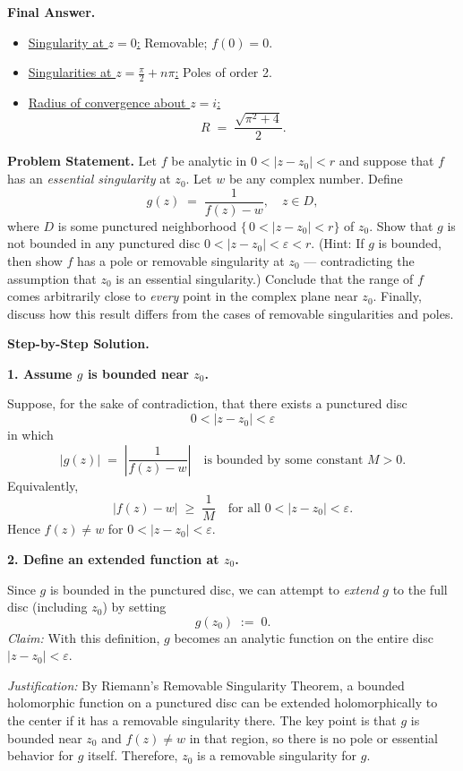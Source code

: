 \documentclass[12pt]{article}
\theoremstyle{definition} %
\theoremstyle{plain} %
\begin{document}
\medskip
\noindent
\textbf{Final Answer.}
\begin{itemize}
\item \underline{Singularity at $z=0$:} Removable; $f(0)=0$.
\item \underline{Singularities at $z = \frac{\pi}{2} + n\pi$:} Poles of order 2.
\item \underline{Radius of convergence about $z=i$:} 
\[
R \;=\; \frac{\sqrt{\pi^2 + 4}}{2}.
\]
\end{itemize}
\textbf{Problem Statement.} 
Let $f$ be analytic in $0 < |z - z_0| < r$ and suppose that $f$ has an \emph{essential singularity} at $z_0$. Let $w$ be any complex number. Define
\[
g(z) \;=\; \frac{1}{f(z) - w}, \quad z \in D,
\]
where $D$ is some punctured neighborhood $\{\,0 < |z - z_0| < r\}$ of $z_0$. Show that $g$ is not bounded in any punctured disc $0 < |z - z_0| < \varepsilon < r$. (Hint: If $g$ is bounded, then show $f$ has a pole or removable singularity at $z_0$ --- contradicting the assumption that $z_0$ is an essential singularity.) Conclude that the range of $f$ comes arbitrarily close to \emph{every} point in the complex plane near $z_0$. Finally, discuss how this result differs from the cases of removable singularities and poles.

\bigskip
\noindent
\textbf{Step-by-Step Solution.}

\medskip
\noindent
\textbf{1. Assume $g$ is bounded near $z_0$.}

Suppose, for the sake of contradiction, that there exists a punctured disc 
\[
0 < |z - z_0| < \varepsilon
\]
in which
\[
\bigl|g(z)\bigr| \;=\; \left|\frac{1}{f(z) - w}\right|\quad
\text{is bounded by some constant } M > 0.
\]
Equivalently,
\[
|f(z) - w| \;\ge\; \frac{1}{M} \quad \text{for all } 0 < |z - z_0| < \varepsilon.
\]
Hence $f(z) \neq w$ for $0 < |z - z_0| < \varepsilon$.

\medskip
\noindent
\textbf{2. Define an extended function at $z_0$.}

Since $g$ is bounded in the punctured disc, we can attempt to \emph{extend} $g$ to the full disc (including $z_0$) by setting
\[
g(z_0) \;:=\; 0.
\]
\emph{Claim:} With this definition, $g$ becomes an analytic function on the entire disc $|z - z_0| < \varepsilon$. 

\smallskip
\noindent
\emph{Justification:} By Riemann's Removable Singularity Theorem, a bounded holomorphic function on a punctured disc can be extended holomorphically to the center if it has a removable singularity there. The key point is that $g$ is bounded near $z_0$ and $f(z) \neq w$ in that region, so there is no pole or essential behavior for $g$ itself. Therefore, $z_0$ is a removable singularity for $g$.
\end{document}
